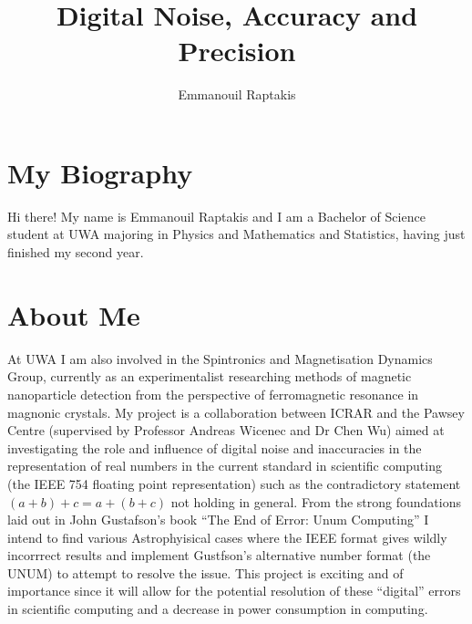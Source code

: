 \documentclass{article}
\begin{document}
\title{Digital Noise, Accuracy and Precision}
\author{Emmanouil Raptakis}

\maketitle

\section{My Biography}
Hi there! My name is Emmanouil Raptakis and I am a Bachelor of Science student at UWA majoring in Physics and Mathematics and Statistics, having just finished my second year. 

\section{About Me}
At UWA I am also involved in the Spintronics and Magnetisation Dynamics Group, currently as an experimentalist researching methods of magnetic nanoparticle detection from the perspective of ferromagnetic resonance in magnonic crystals. My project is a collaboration between ICRAR and the Pawsey Centre (supervised by Professor Andreas Wicenec and Dr Chen Wu) aimed at investigating the role and influence of digital noise and inaccuracies in the representation of real numbers in the current standard in scientific computing (the IEEE 754 floating point representation) such as the contradictory statement $(a+b)+c = a+(b+c)$ not holding in general. From the strong foundations laid out in John Gustafson's book ``The End of Error: Unum Computing'' I intend to find various Astrophyisical cases where the IEEE format gives wildly incorrrect results and implement Gustfson's alternative number format (the UNUM) to attempt to resolve the issue. This project is exciting and of importance since it will allow for the potential resolution of these ``digital'' errors in scientific computing and a decrease in power consumption in computing.
\end{document}

